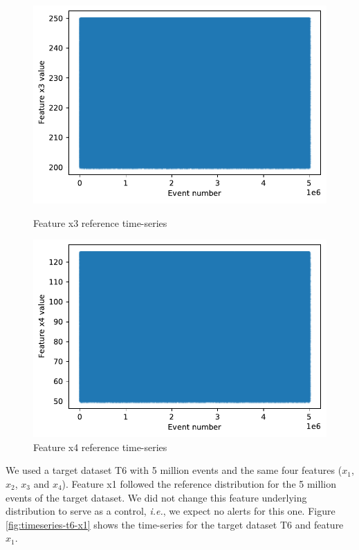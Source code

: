 \begin{figure}[!htb]
\begin{minipage}[b]{0.5\linewidth}
    \includegraphics[width=1\linewidth]{figures/timeseries-r6-x3.pdf} 
    \caption{Feature x3 reference time-series} 
    \label{fig:timeseries-r6-x3} 
    \vspace{4ex}
  \end{minipage}%
  \begin{minipage}[b]{0.5\linewidth}
    \centering
    \includegraphics[width=1\linewidth]{figures/timeseries-r6-x4.pdf} 
    \caption{Feature x4 reference time-series} 
    \label{fig:timeseries-r6-x4} 
    \vspace{4ex}
  \end{minipage} 
\end{figure}

We used a target dataset T6 with 5 million events and the same four features ($x_1$, $x_2$, $x_3$ and $x_4$). Feature x1 followed the reference distribution for the 5 million events of the target dataset. We did not change this feature underlying distribution to serve as a control, \textit{i.e.}, we expect no alerts for this one. Figure \ref{fig:timeseries-t6-x1} shows the time-series for the target dataset T6 and feature $x_1$.

